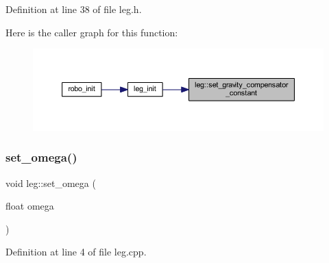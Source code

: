 Definition at line 38 of file leg.\+h.

Here is the caller graph for this function\+:
\nopagebreak
\begin{figure}[H]
\begin{center}
\leavevmode
\includegraphics[width=350pt]{classleg_a2ef282bddb5ac1f2583a3230782c59fd_icgraph}
\end{center}
\end{figure}
\mbox{\label{classleg_a0b0845622d8b17f34739b390846bf957}} 
\subsubsection{\texorpdfstring{set\_omega()}{set\_omega()}}
{\footnotesize\ttfamily void leg\+::set\+\_\+omega (\begin{DoxyParamCaption}\item[{float}]{omega }\end{DoxyParamCaption})}



Definition at line 4 of file leg.\+cpp.

